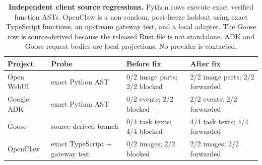 \begin{table}[H]
\centering
\scriptsize
\setlength{\tabcolsep}{2.1pt}
\caption{\textbf{Independent client source regressions.} Python rows execute exact verified function ASTs. OpenClaw is a non-random, post-freeze holdout using exact TypeScript functions, an upstream gateway test, and a local adapter. The Goose row is source-derived because the released Rust file is not standalone. ADK and Goose request bodies are local projections. No provider is contacted.}
\label{tab:independent-client-sources}
\begin{tabular}{@{}p{.18\linewidth}p{.25\linewidth}p{.20\linewidth}p{.20\linewidth}@{}}
\toprule
Project & Probe & Before fix & After fix \\
\midrule
Open WebUI & exact Python AST & 0/2 image parts; 2/2 blocked & 2/2 image parts; 2/2 forwarded \\
Google ADK & exact Python AST & 0/2 events; 2/2 blocked & 2/2 events; 2/2 forwarded \\
Goose & source-derived branch & 0/4 task texts; 4/4 blocked & 4/4 task texts; 4/4 forwarded \\
OpenClaw & exact TypeScript + gateway test & 0/2 images; 2/2 blocked & 2/2 images; 2/2 forwarded \\
\bottomrule
\end{tabular}
\end{table}
